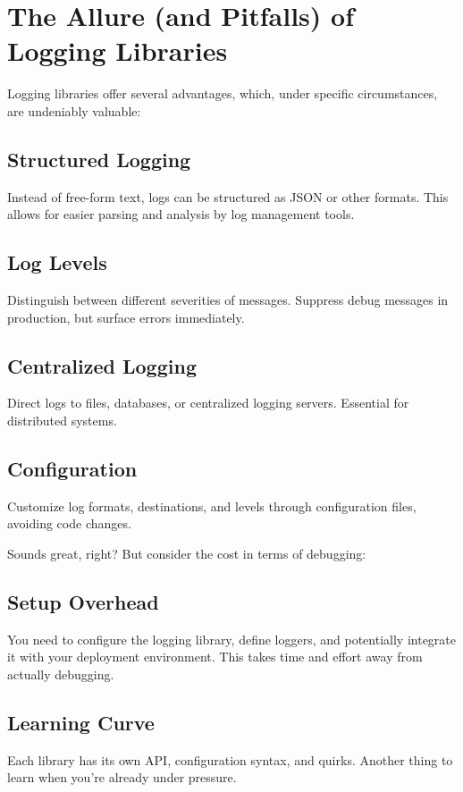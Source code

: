 \documentclass{article}
\begin{document}
\section*{The Allure (and Pitfalls) of Logging Libraries}

Logging libraries offer several advantages, which, under specific circumstances, are undeniably valuable:

\subsection*{Structured Logging}
Instead of free-form text, logs can be structured as JSON or other formats. This allows for easier parsing and analysis by log management tools.

\subsection*{Log Levels}
Distinguish between different severities of messages. Suppress debug messages in production, but surface errors immediately.

\subsection*{Centralized Logging}
Direct logs to files, databases, or centralized logging servers. Essential for distributed systems.

\subsection*{Configuration}
Customize log formats, destinations, and levels through configuration files, avoiding code changes.

Sounds great, right? But consider the cost in terms of debugging:

\subsection*{Setup Overhead}
You need to configure the logging library, define loggers, and potentially integrate it with your deployment environment. This takes time and effort away from actually debugging.

\subsection*{Learning Curve}
Each library has its own API, configuration syntax, and quirks. Another thing to learn when you're already under pressure.
\end{document}
